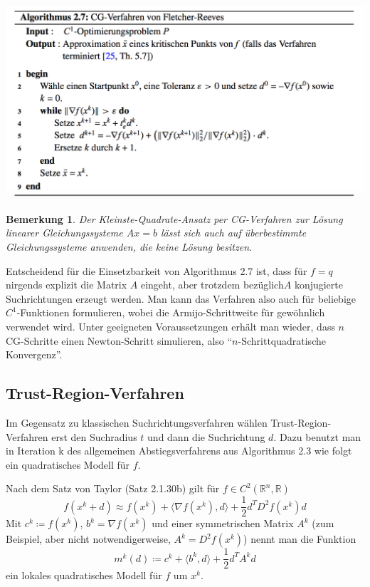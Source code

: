 \documentclass[11pt]{scrreprt}
\newcounter{thm}
\theoremstyle{thmstyle}
\numberwithin{thm}{section}
\newtheorem{bemerkung}[thm]{Bemerkung}
\begin{document}
\begin{center}
	\includegraphics[scale=0.5]{img/a27}
\end{center}

\begin{bemerkung}
	Der Kleinste-Quadrate-Ansatz per CG-Verfahren zur Lösung linearer Gleichungssysteme $Ax = b$ lässt sich auch auf überbestimmte Gleichungssysteme anwenden, die keine Lösung besitzen.	
\end{bemerkung}

Entscheidend für die Einsetzbarkeit von Algorithmus 2.7 ist, dass für $f = q$ nirgends explizit die Matrix $A$ eingeht, aber trotzdem bezüglich$A$ konjugierte Suchrichtungen erzeugt werden. Man kann das Verfahren also auch für beliebige $C^1$-Funktionen formulieren, wobei die Armijo-Schrittweite für gewöhnlich verwendet wird. Unter geeigneten Voraussetzungen erhält man wieder, dass $n$ CG-Schritte einen Newton-Schritt simulieren, also \enquote{$n$-Schrittquadratische Konvergenz}. 

\subsection*{Trust-Region-Verfahren}

Im Gegensatz zu klassischen Suchrichtungsverfahren wählen Trust-Region-Verfahren erst den Suchradius $t$ und dann die Suchrichtung $d$. Dazu benutzt man in Iteration k des allgemeinen Abstiegsverfahrens aus Algorithmus 2.3 wie folgt ein quadratisches Modell für $f$. ~\bigskip

Nach dem Satz von Taylor (Satz 2.1.30b) gilt für $f \in C^2(\mathbb{R}^n, \mathbb{R})$
$$ f(x^k + d) \approx f(x^k) + \langle \nabla f(x^k) , d \rangle + \frac{1}{2} d^T D^2 f(x^k) d $$
Mit $c^k \coloneqq f(x^k)$, $b^k = \nabla f(x^k)$ und einer symmetrischen Matrix $A^k$ (zum Beispiel, aber nicht notwendigerweise, $A^k = D^2 f(x^k)$) nennt man die Funktion
$$ m^k(d) \coloneqq c^k + \langle b^k, d \rangle + \frac{1}{2} d^T A^k d $$
ein lokales quadratisches Modell für $f$ um $x^k$.  ~\bigskip
\end{document}
